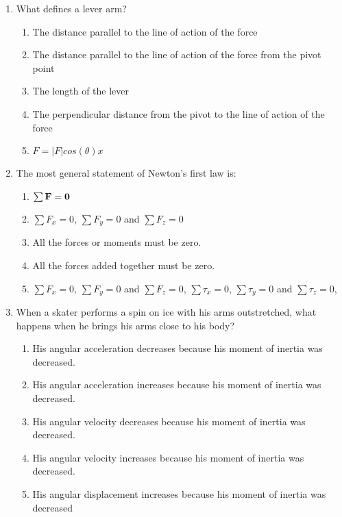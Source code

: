 \documentclass{../../../oss-apphys}
\begin{document}
\genheader


\genmultidirections

\gengravity

\raggedcolumns
\begin{multicols}{2}
  \begin{enumerate}[leftmargin=18pt]

  \item What defines a lever arm?
    \begin{enumerate}[nosep,leftmargin=18pt,label=(\Alph*)]
    \item The distance parallel to the line of action of the force
    \item The distance parallel to the line of action of the force from the
      pivot point
    \item The length of the lever
    \item The perpendicular distance from the pivot to the line of action of
      the force
    \item $F = |F|cos(\theta)x$
    \end{enumerate}
    
  \item The most general statement of Newton's first law is:
    \begin{enumerate}[nosep,leftmargin=18pt,label=(\Alph*)]
    \item $\sum\mathbf{F}=\mathbf{0}$
    \item $\sum F_x=0$, $\sum F_y=0$ and $\sum F_z=0$
    \item All the forces or moments must be zero.
    \item All the forces added together must be zero.
    \item $\sum F_x=0$, $\sum F_y=0$ and $\sum F_z=0$, $\sum\tau_x=0$,
      $\sum\tau_y=0$ and $\sum\tau_z=0$,
    \end{enumerate}
    
  \item When a skater performs a spin on ice with his arms outstretched, what
    happens when he brings his arms close to his body?
    \begin{enumerate}[nosep,leftmargin=18pt,label=(\Alph*)]
    \item His angular acceleration decreases because his moment of inertia
      was decreased.
    \item His angular acceleration increases because his moment of inertia
      was decreased.
    \item His angular velocity decreases because his moment of inertia was
      decreased.
    \item His angular velocity increases because his moment of inertia was
      decreased.
    \item His angular displacement increases because his moment of inertia
      was decreased
    \end{enumerate}
    

\end{enumerate}
\end{multicols}
\end{document}
